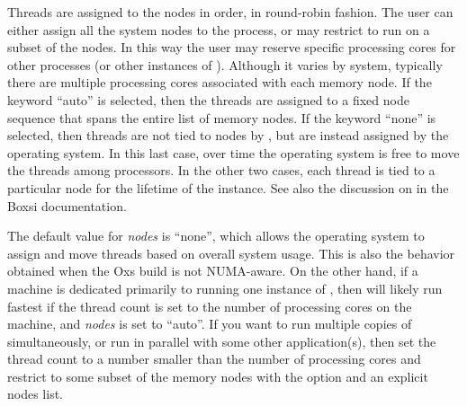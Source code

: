 \begin{description}
  Threads are assigned to the nodes in order, in round-robin fashion.
  The user can either assign all the system nodes to the 
  process, or may restrict  to run on a subset of the nodes.
  In this way the user may reserve specific processing cores for other
  processes (or other instances of ).  Although it varies by
  system, typically there are multiple processing cores associated with
  each memory node.  If the keyword ``auto'' is selected, then the
  threads are assigned to a fixed node sequence that spans the entire
  list of memory nodes.  If the keyword ``none'' is selected, then
  threads are not tied to nodes by , but are instead assigned
  by the operating system.  In this last case, over time the operating
  system is free to move the threads among processors.  In the other two
  cases, each thread is tied to a particular node for the lifetime of
  the  instance.  See also the discussion
  on  in the
  Boxsi documentation.

  The default value for \textit{nodes} is ``none'', which allows the
  operating system to assign and move threads based on overall system
  usage.  This is also the behavior obtained when the Oxs build is not
  NUMA-aware.  On the other hand, if a machine is dedicated primarily
  to running one instance of , then  will
  likely run fastest if the thread count is set to the number of
  processing cores on the machine, and \textit{nodes} is set to
  ``auto''.  If you want to run multiple copies of 
  simultaneously, or run  in parallel with some other
  application(s), then set the thread count to a number smaller than
  the number of processing cores and restrict  to some
  subset of the memory nodes with the  option and an
  explicit nodes list.


\end{description}
